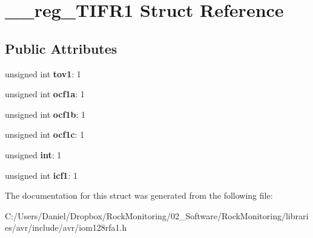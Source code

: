 \hypertarget{struct____reg___t_i_f_r1}{}\section{\+\_\+\+\_\+reg\+\_\+\+T\+I\+F\+R1 Struct Reference}
\label{struct____reg___t_i_f_r1}
\subsection*{Public Attributes}
\begin{DoxyCompactItemize}
\item 
unsigned int {\bfseries tov1}\+: 1\hypertarget{struct____reg___t_i_f_r1_a77b7067f633bdfead2105cc49feb2f05}{}\label{struct____reg___t_i_f_r1_a77b7067f633bdfead2105cc49feb2f05}

\item 
unsigned int {\bfseries ocf1a}\+: 1\hypertarget{struct____reg___t_i_f_r1_a83aecaff900b7413d74970895f7a6d51}{}\label{struct____reg___t_i_f_r1_a83aecaff900b7413d74970895f7a6d51}

\item 
unsigned int {\bfseries ocf1b}\+: 1\hypertarget{struct____reg___t_i_f_r1_aa0766d16580cf6a91ad9cdfec8b95a13}{}\label{struct____reg___t_i_f_r1_aa0766d16580cf6a91ad9cdfec8b95a13}

\item 
unsigned int {\bfseries ocf1c}\+: 1\hypertarget{struct____reg___t_i_f_r1_af2345fe7fde9c89b7172752bcbb3a8de}{}\label{struct____reg___t_i_f_r1_af2345fe7fde9c89b7172752bcbb3a8de}

\item 
unsigned {\bfseries int}\+: 1\hypertarget{struct____reg___t_i_f_r1_a7e93188ae17321534da24e1a9ff1e18e}{}\label{struct____reg___t_i_f_r1_a7e93188ae17321534da24e1a9ff1e18e}

\item 
unsigned int {\bfseries icf1}\+: 1\hypertarget{struct____reg___t_i_f_r1_ae31db0d465dc75b58675c5dc197b4fb5}{}\label{struct____reg___t_i_f_r1_ae31db0d465dc75b58675c5dc197b4fb5}

\end{DoxyCompactItemize}


The documentation for this struct was generated from the following file\+:\begin{DoxyCompactItemize}
\item 
C\+:/\+Users/\+Daniel/\+Dropbox/\+Rock\+Monitoring/02\+\_\+\+Software/\+Rock\+Monitoring/libraries/avr/include/avr/iom128rfa1.\+h\end{DoxyCompactItemize}
